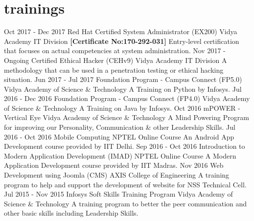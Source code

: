 \documentclass[]{friggeri-cv}
\begin{document}
\section{trainings}
\begin{entrylist}
	\entry
	{Oct 2017 - Dec 2017}
	{Red Hat Certified System Administrator (EX200)}
	{Vidya Academy IT Division \newline \textbf{[Certificate No:170-292-031]}}
	{Entry-level certification that focuses on actual competencies at system administration.}
	\entry
	{Nov 2017 - Ongoing}
	{Certified Ethical Hacker (CEHv9)}
	{Vidya Academy IT Division}
	{A methodology that can be used in a penetration testing or ethical hacking situation.}
	\entry
	{Jun 2017 - Jul 2017}
	{Foundation Program - Campus Connect (FP5.0)}
	{Vidya Academy of Science \& Technology}
	{A Training on Python by Infosys.}
	\entry
	{Jul 2016 - Dec 2016}
	{Foundation Program - Campus Connect (FP4.0)}
	{Vidya Academy of Science \& Technology}
	{A Training on Java by Infosys.}
	\entry
	{Oct 2016}
	{mPOWER - Vertical Eye}
	{Vidya Academy of Science \& Technology}
	{A Mind Powering Program for improving our Personality, Communication \& other Leadership Skills.}
    \entry
	{Jul 2016 - Oct 2016}
	{Mobile Computing}
	{NPTEL Online Course}
	{An Android App Development course provided by IIT Delhi.}
    \entry
	{Sep 2016 - Oct 2016}
	{Introduction to Modern Application Development (IMAD)}
	{NPTEL Online Course}
	{A Modern Application Development course provided by IIT Madras.}
    \entry
	{Nov 2016}
	{Web Development using Joomla (CMS)}
	{AXIS College of Engineering}
	{A training program to help and support the development of website for NSS Technical Cell.}
    \entry
	{Jul 2015 - Nov 2015}
	{Infosys Soft Skills Training Program}
	{Vidya Academy of Science \& Technology}
	{A training program to better the peer communication and other basic skills including Leadership Skills.}
\end{entrylist}
\end{document}
